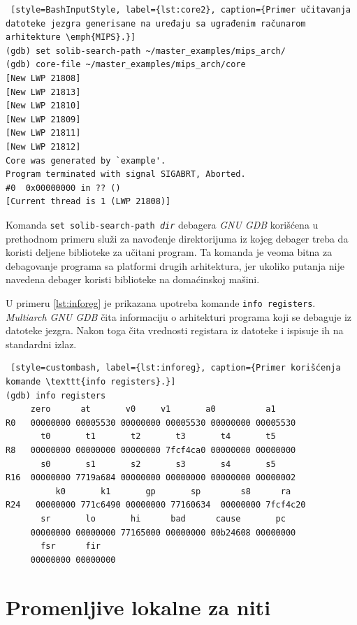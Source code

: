 \documentclass[12pt,oneside]{memoir}
\begin{document}
\begin{lstlisting} [style=BashInputStyle, label={lst:core2}, caption={Primer učitavanja datoteke jezgra generisane na uređaju sa ugrađenim računarom arhitekture \emph{MIPS}.}]
(gdb) set solib-search-path ~/master_examples/mips_arch/
(gdb) core-file ~/master_examples/mips_arch/core
[New LWP 21808]
[New LWP 21813]
[New LWP 21810]
[New LWP 21809]
[New LWP 21811]
[New LWP 21812]
Core was generated by `example'.
Program terminated with signal SIGABRT, Aborted.
#0  0x00000000 in ?? ()
[Current thread is 1 (LWP 21808)]
\end{lstlisting}

Komanda \texttt{set solib-search-path \emph{dir}} debagera \emph{GNU GDB} korišćena u prethodnom primeru služi za navođenje direktorijuma iz kojeg debager treba da koristi deljene biblioteke za učitani program. Ta komanda je veoma bitna za debagovanje programa sa platformi drugih arhitektura, jer ukoliko putanja nije navedena debager koristi biblioteke na domaćinskoj mašini.

U primeru \ref{lst:inforeg} je prikazana upotreba komande \texttt{info registers}. \emph{Multiarch GNU GDB} čita informaciju o arhitekturi programa koji se debaguje iz datoteke jezgra. Nakon toga čita vrednosti registara iz datoteke i ispisuje ih na standardni izlaz.

\begin{lstlisting} [style=custombash, label={lst:inforeg}, caption={Primer korišćenja komande \texttt{info registers}.}]
(gdb) info registers 
	 zero      at       v0     v1       a0	        a1       
R0   00000000 00005530 00000000 00005530 00000000 00005530
       t0       t1       t2       t3       t4       t5       
R8   00000000 00000000 00000000 7fcf4ca0 00000000 00000000
       s0       s1       s2       s3       s4       s5       
R16  00000000 7719a684 00000000 00000000 00000000 00000002
          k0       k1       gp       sp        s8      ra
R24   00000000 771c6490 00000000 77160634  00000000 7fcf4c20
       sr       lo       hi      bad      cause       pc
     00000000 00000000 77165000 00000000 00b24608 00000000 
       fsr      fir
     00000000 00000000
\end{lstlisting}

\chapter{Promenljive lokalne za niti}
\label{chp:TLS}
\end{document}
